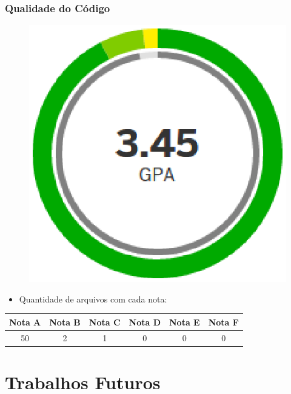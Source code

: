 \documentclass{beamer}
\begin{document}
\begin{frame}
\frametitle{Qualidade do Código}

\begin{figure}[!h]
	\centering
	\includegraphics[scale=0.5]{figuras/gpa.eps}
\end{figure}

\begin{itemize}
	\item{Quantidade de arquivos com cada nota:}
\end{itemize}

\begin{table}[!h]
\centering
\begin{tabular}{cccccc}
\toprule
\textbf{Nota A} & \textbf{Nota B} & \textbf{Nota C} & \textbf{Nota D} & \textbf{Nota E} & \textbf{Nota F} \\ \midrule
50 & 2 & 1 & 0 & 0 & 0							   \\ \bottomrule
\end{tabular}
\end{table}

\end{frame}

\section{Trabalhos Futuros}
\end{document}
